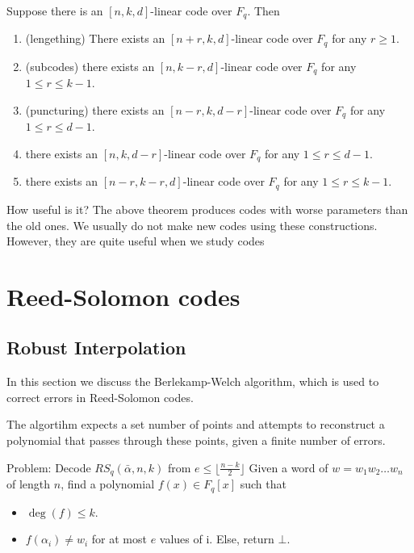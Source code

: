 \begin{theorem}
    Suppose there is an $[n, k, d]$-linear code over $F_q$. Then
    \begin{enumerate}
        \item (lengething) There exists an $[n + r, k, d]$-linear code over 
        $F_q$ for any $r \ge 1$.

        \item (subcodes) there exists an $[n, k-r, d]$-linear code over $F_q$ for any 
        $1 \le r \le k- 1$.

        \item (puncturing) there exists an $[n- r, k, d- r]$-linear code over $F_q$ for any
        $1 \le r \le d- 1$.

        \item there exists an $[n, k, d- r]$-linear code over $F_q$ for any $1 \le r \le d- 1$.
        
        \item there exists an $[n- r, k- r, d]$-linear code over $F_q$ for any $1 \le r \le k- 1$.
    \end{enumerate}
\end{theorem}

\begin{bclogo}[couleur=blue!10, arrondi=0.1, logo=\bcinfo]{How useful is it?}
The above theorem produces codes with worse
parameters than the old ones. We usually do not make new codes using these
constructions. However, they are quite useful when we study codes
\end{bclogo}


\section{Reed-Solomon codes}


\subsection{Robust Interpolation}
In this section we discuss the Berlekamp-Welch algorithm, 
which is used to correct errors in Reed-Solomon codes.

The algortihm expects a set number of points and attempts to reconstruct 
a polynomial that passes through these points, given a finite number of errors.

\begin{bclogo}[logo=\bcattention,noborder=true]{Problem: Decode $RS_q(\bar{\alpha},n,k)$ from $e\le \lfloor\frac{n-k}{2}\rfloor$}
Given a word of $w=w_1w_2\dots w_n$ of length $n$, 
find a polynomial $f(x)\in F_q[x]$ such that
\begin{itemize}
    \item $\deg(f)\le k$.
    \item $f(\alpha_i)\ne w_i$ for at most $e$ values of i. Else, return $\bot$.
\end{itemize}

\end{bclogo}

